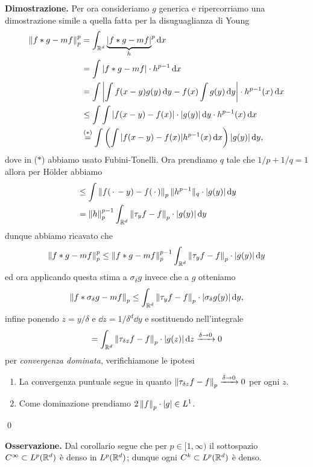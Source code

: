 \textbf{Dimostrazione.}
Per ora consideriamo $g$ generica e ripercorriamo una dimostrazione simile a quella fatta per la disuguaglianza di Young
$$
\begin{aligned}
	\left\lVert f \ast g - m f \right\rVert_p^p 
	&= \int_{\mathbb R^d} {\underbrace{|f \ast g - m f|}_h}^p \,\mathrm{d} x \\
	&= \int |f \ast g - m f| \cdot h^{p-1} \,\mathrm{d} x \\
	&= \int \left| \int f(x - y) g(y) \,\mathrm{d} y - f(x) \int g(y) \,\mathrm{d} y \right| \cdot h^{p-1}(x) \,\mathrm{d} x \\
	&\leq \int \int |f(x - y) - f(x)| \cdot |g(y)| \,\mathrm{d} y \cdot h^{p-1}(x) \,\mathrm{d} x \\
	&\overset{\text{($*$)}}{=} \int \left(\int |f(x - y) - f(x)| h^{p-1}(x) \,\mathrm{d} x \right) |g(y)| \,\mathrm{d} y,
\end{aligned}
$$
dove in ($*$) abbiamo usato Fubini-Tonelli. Ora prendiamo $q$ tale che $1/p + 1/q = 1$ allora per H\"older abbiamo
$$
\begin{aligned}
	&\leq \int \left\lVert f(\,\cdot\, - y) - f(\,\cdot\,) \right\rVert_p \| h^{p-1} \|_q \cdot |g(y)| \,\mathrm{d} y \\
	&= \left\lVert h \right\rVert_p^{p-1} \int_{\mathbb R^d} \left\lVert \tau_y f - f \right\rVert_p \cdot |g(y)| \,\mathrm{d} y \\
\end{aligned}
$$
dunque abbiamo ricavato che
$$
\left\lVert f \ast g - m f \right\rVert_p^p 
\leq \left\lVert f \ast g - m f \right\rVert_p^{p-1} \int_{\mathbb R^d} \left\lVert \tau_y f - f \right\rVert_p \cdot |g(y)| \,\mathrm{d} y
$$
ed ora applicando questa stima a $\sigma_\delta g$ invece che a $g$ otteniamo
$$
\left\lVert f \ast \sigma_\delta g - m f \right\rVert_p
\leq \int_{\mathbb R^d} \left\lVert \tau_y f - f \right\rVert_p \cdot |\sigma_\delta g(y)| \,\mathrm{d} y,
$$
infine ponendo $z = y / \delta$ e $\dd z = 1/\delta^d \dd y$ e sostituendo nell'integrale
$$
= \int_{\mathbb R^d} \left\lVert \tau_{\delta z} f - f \right\rVert_p \cdot |g(z)| \,\mathrm{d} z \xrightarrow{\delta \to 0} 0
$$
per \textit{convergenza dominata}, verifichiamone le ipotesi
\begin{enumerate}
	\item La convergenza puntuale segue in quanto $\left\lVert \tau_{\delta z} f - f \right\rVert_p \xrightarrow{\delta \to 0} 0$ per ogni $z$.
	\item Come dominazione prendiamo $2 \left\lVert f \right\rVert_p \cdot |g| \in L^1$.
\end{enumerate}
\qed

\vss


\textbf{Osservazione.} Dal corollario segue che per $p \in [1,\infty)$ il sottospazio $C^\infty \subset L^p(\mathbb R^d)$ è denso in $L^p(\mathbb R^d)$; dunque ogni $C^k \subset L^p(\mathbb R^d)$ è denso.
